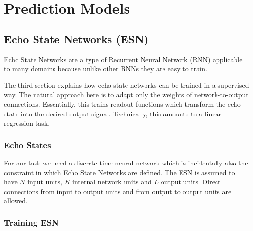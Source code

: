 \section*{Prediction Models}

\subsection*{Echo State Networks (ESN)}
Echo State Networks are a type of Recurrent Neural Network (RNN) applicable to many domains because unlike other RNNs they are easy to train.

\cite{jaeger_echo_state_RNN}
The third section explains how echo state networks can be trained in a
supervised way. The natural approach here is to adapt only the weights
of network-to-output connections. Essentially, this trains readout functions
which transform the echo state into the desired output signal. Technically,
this amounts to a linear regression task.

\subsubsection*{Echo States}
For our task we need a discrete time neural network which is incidentally also the constraint in which Echo State Networks are defined. The ESN is assumed to have $N$ input units, $K$ internal network units and $L$ output units. Direct connections from input to output units and from output to output units are allowed.

\subsubsection*{Training ESN}